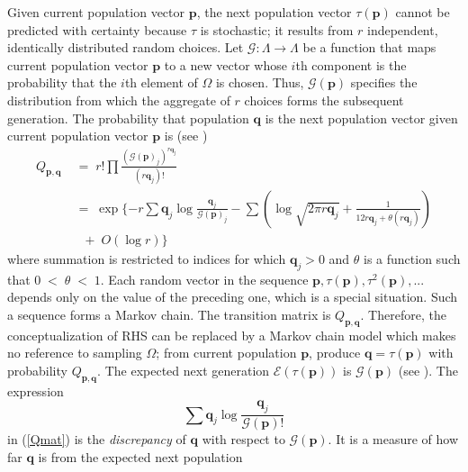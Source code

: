 Given current population vector $\bm{p}$, the next population vector $\tau(\bm{p})$ cannot 
be predicted with certainty because $\tau$ is stochastic; it results from $r$ independent, identically distributed random choices. 
Let $\mathcal{G}:\Lambda \rightarrow \Lambda$ be a function that maps 
current population vector $\bm{p}$ to a new vector whose $i$th component 
is the probability that the $i$th element of $\Omega$ is chosen. Thus, $\mathcal{G}(\bm{p})$ 
specifies the distribution from which the aggregate 
of $r$ choices forms the subsequent generation. The probability that population $\bm{q}$ is 
the next population vector given current population vector $\bm{p}$ is (see \cite{Vose1999}) 
\begin{equation}
\label{Qmat}
\begin{split}
Q_{\bm{p},\bm{q}} & \;=\; r! \prod \frac{(\mathcal{G}(\bm{p})_j)^{r\bm{q}_j}}{(r\bm{q}_j)!} \\
& \;=\; \exp\{-r \sum \bm{q}_j \log \frac{\bm{q}_j}{\mathcal{G}(\bm{p})_j} - \sum (\log \sqrt{2 \pi r\bm{q}_j}  + \frac{1}{12r\bm{q}_j + \theta (r\bm{q}_j)}) \\      
& \;\;\; + \; O(\log r)\}
\end{split}
\end{equation}
where summation is restricted to indices for which $\bm{q}_j > 0$ and $\theta$ is a function such that $0 \;<\; \theta \;<\; 1$.
Each random vector in the sequence $\bm{p}, \tau(\bm{p}), \tau^2(\bm{p}),...$ depends only on the value of the preceding one, 
which is a special situation. Such a sequence forms a Markov chain. The transition matrix is $Q_{\bm{p},\bm{q}}$. Therefore, 
the conceptualization of RHS can be replaced by a Markov chain model which makes no reference to sampling $\Omega$; 
from current population $\bm{p}$, produce $\bm{q} = \tau (\bm{p})$ with probability $Q_{\bm{p},\bm{q}}$. The expected next generation 
$\mathcal{E}(\tau (\bm{p}))$ is $\mathcal{G}(\bm{p})$ (see \cite{Vose1999}). The expression 
\[
\sum \bm{q}_j \log \frac{\bm{q}_j}{\mathcal{G}(\bm{p})!}
\]
in (\ref{Qmat}) is the {\em discrepancy} of $\bm{q}$ with respect to $\mathcal{G}(\bm{p})$. It is a measure of how far $\bm{q}$ is from the expected next population 
